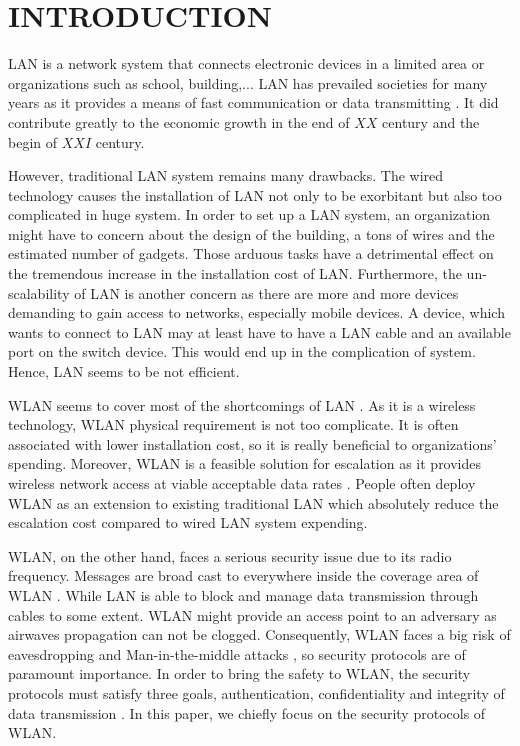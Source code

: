 \section{INTRODUCTION}

\ac{LAN} \cite{stallings1984local} is a network system that connects electronic devices in a limited area or organizations such as school, building,...  LAN has prevailed societies for many years as it provides a means of fast communication or data transmitting \cite{schultheis1988designing}. It did contribute greatly to the economic growth in the end of $XX$ century and the begin of $XXI$ century.

However, traditional \ac{LAN} system remains many drawbacks. The wired technology causes the installation of \ac{LAN} not only to be exorbitant but also too complicated in huge system. In order to set up a \ac{LAN} system, an organization might have to concern about the design of the building, a tons of wires and the estimated number of gadgets. Those arduous tasks have  a detrimental effect on the tremendous increase in the installation cost of \ac{LAN}. Furthermore, the un-scalability of \ac{LAN} is another concern as there are more and more devices demanding to gain access to networks, especially mobile devices. A device, which wants to connect to \ac{LAN} may at least have to have a \ac{LAN} cable and an available port on the switch device. This would end up in the complication of system. Hence, \ac{LAN} seems to be not efficient.

\ac{WLAN} seems to cover most of the shortcomings of \ac{LAN} \cite{al2006ieee}.  As it is a wireless technology, \ac{WLAN} physical requirement is not too complicate. It is often associated with lower installation cost, so it is really beneficial to organizations' spending. Moreover, \ac{WLAN} is a feasible solution for escalation as it provides wireless network access at viable acceptable data rates \cite{al2006ieee}. People often deploy \ac{WLAN} as an extension to existing traditional \ac{LAN} which absolutely reduce the escalation cost compared to wired \ac{LAN} system expending.

\ac{WLAN}, on the other hand, faces a serious security issue due to its radio frequency. Messages are broad cast to everywhere inside the coverage area of \ac{WLAN} \cite{ieee1999802, shin2006wireless}. While \ac{LAN} is able to block and manage data transmission through cables to some extent. \ac{WLAN} might provide an access point to an adversary as airwaves propagation can not be clogged. Consequently, \ac{WLAN} faces a big risk of eavesdropping and Man-in-the-middle attacks \cite{shunman2003wlan}, so security protocols are of paramount importance. In order to bring the safety to \ac{WLAN}, the security protocols must satisfy three goals, authentication, confidentiality and integrity of data transmission \cite{gast2005802}. In this paper, we chiefly focus on the security protocols of \ac{WLAN}.

